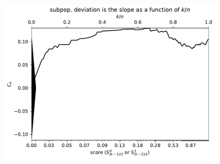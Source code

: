 \documentclass{article}
\newlength{\vertsep}
\newlength{\imsize}
\begin{document}
\begin{figure}
\begin{centering}

\parbox{\imsize}{\includegraphics[width=\imsize]
{../codes/unweighted/nll-1-323-monarch-monarch-butterfly-milkweed-butterfly-Danaus-plexippus_342-wild-boar-boar-Sus-scrofa.pdf}}

\vspace{\vertsep}


\end{centering}
\end{figure}
\end{document}
